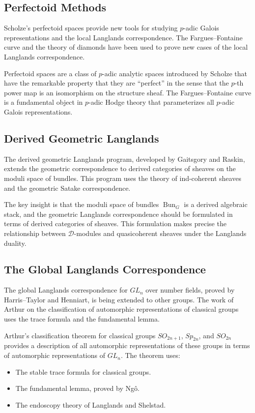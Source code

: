 \subsection{Perfectoid Methods}

Scholze's perfectoid spaces provide new tools for studying $p$-adic Galois representations and the local Langlands correspondence. The Fargues--Fontaine curve and the theory of diamonds have been used to prove new cases of the local Langlands correspondence.

Perfectoid spaces are a class of $p$-adic analytic spaces introduced by Scholze that have the remarkable property that they are ``perfect'' in the sense that the $p$-th power map is an isomorphism on the structure sheaf. The Fargues--Fontaine curve is a fundamental object in $p$-adic Hodge theory that parameterizes all $p$-adic Galois representations.

\subsection{Derived Geometric Langlands}

The derived geometric Langlands program, developed by Gaitsgory and Raskin, extends the geometric correspondence to derived categories of sheaves on the moduli space of bundles. This program uses the theory of ind-coherent sheaves and the geometric Satake correspondence.

The key insight is that the moduli space of bundles $\operatorname{Bun}_G$ is a derived algebraic stack, and the geometric Langlands correspondence should be formulated in terms of derived categories of sheaves. This formulation makes precise the relationship between $\mathcal{D}$-modules and quasicoherent sheaves under the Langlands duality.

\subsection{The Global Langlands Correspondence}

The global Langlands correspondence for $GL_n$ over number fields, proved by Harris--Taylor and Henniart, is being extended to other groups. The work of Arthur on the classification of automorphic representations of classical groups uses the trace formula and the fundamental lemma.

Arthur's classification theorem for classical groups $SO_{2n+1}$, $Sp_{2n}$, and $SO_{2n}$ provides a description of all automorphic representations of these groups in terms of automorphic representations of $GL_n$. The theorem uses:
\begin{itemize}
\item The stable trace formula for classical groups.
\item The fundamental lemma, proved by Ng\^o.
\item The endoscopy theory of Langlands and Shelstad.
\end{itemize}

